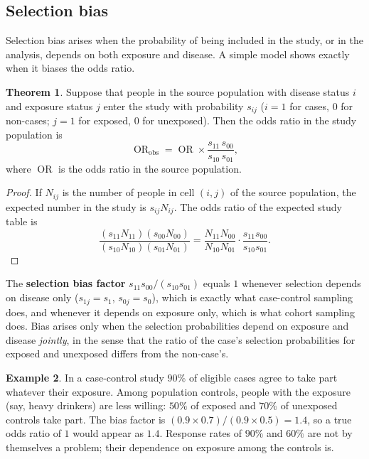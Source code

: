 \documentclass[11pt,a4paper]{article}
\numberwithin{equation}{section}
\DeclareMathOperator{\OR}{OR}
\theoremstyle{definition}
\newtheorem{thm}{Theorem}[subsection]
\newtheorem{exa}[thm]{Example}
\begin{document}
\subsection{Selection bias}
\label{sec:selection}

Selection bias arises when the probability of being included in the study, or in the analysis, depends on both exposure and disease.
A simple model shows exactly when it biases the odds ratio.

\begin{thm}
\label{thm:selection}
Suppose that people in the source population with disease status $i$ and exposure status $j$ enter the study with probability $s_{ij}$
($i = 1$ for cases, $0$ for non-cases; $j = 1$ for exposed, $0$ for unexposed). Then the odds ratio in the study population is
\[
\OR_{\text{obs}} = \OR \times \frac{s_{11}\,s_{00}}{s_{10}\,s_{01}} ,
\]
where $\OR$ is the odds ratio in the source population.
\end{thm}

\begin{proof}
If $N_{ij}$ is the number of people in cell $(i, j)$ of the source population, the expected number in the study is $s_{ij}N_{ij}$. The odds ratio of
the expected study table is
\[
\frac{(s_{11}N_{11})(s_{00}N_{00})}{(s_{10}N_{10})(s_{01}N_{01})} = \frac{N_{11}N_{00}}{N_{10}N_{01}} \cdot \frac{s_{11}s_{00}}{s_{10}s_{01}} .
\]
\end{proof}

The \textbf{selection bias factor} $s_{11}s_{00}/(s_{10}s_{01})$ equals $1$ whenever selection depends on disease only ($s_{1j} = s_1$, $s_{0j} = s_0$), which is
exactly what case-control sampling does, and whenever it depends on exposure only, which is what cohort sampling does. Bias arises only
when the selection probabilities depend on exposure and disease \emph{jointly}, in the sense that the ratio of the case's selection
probabilities for exposed and unexposed differs from the non-case's.

\begin{exa}
In a case-control study $90\%$ of eligible cases agree to take part whatever their exposure. Among population controls, people with
the exposure (say, heavy drinkers) are less willing: $50\%$ of exposed and $70\%$ of unexposed controls take part. The bias factor is
$(0.9 \times 0.7)/(0.9 \times 0.5) = 1.4$, so a true odds ratio of $1$ would appear as $1.4$. Response rates of $90\%$ and $60\%$ are not by themselves
a problem; their dependence on exposure among the controls is.
\end{exa}
\end{document}
